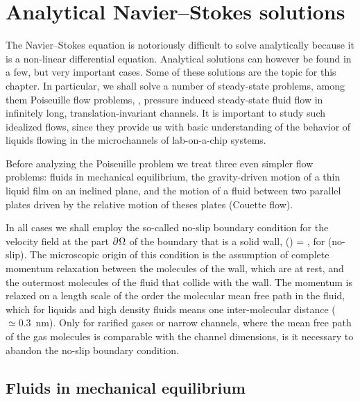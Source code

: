 

\chapter{Analytical Navier--Stokes solutions}

The Navier--Stokes equation is notoriously difficult to solve
analytically because it is a non-linear differential equation.
Analytical solutions can however be found in a few, but very
important cases. Some of these solutions are the topic for this
chapter. In particular, we shall solve a number of steady-state
problems, among them Poiseuille flow problems, \ie, pressure
induced steady-state fluid flow in infinitely long,
translation-invariant channels. It is important to study such
idealized flows, since they provide us with basic understanding of
the behavior of liquids flowing in the microchannels of
lab-on-a-chip systems.

Before analyzing the Poiseuille problem we treat three even
simpler flow problems: fluids in mechanical equilibrium, the
gravity-driven motion of a thin liquid film on an inclined plane,
and the motion of a fluid between two parallel plates driven by
the relative motion of theses plates (Couette flow).

In all cases we shall employ the so-called no-slip boundary
condition for the velocity field at the part $\partial^{{}} \Omega$ of the
boundary that is a solid wall,
%
 \vvv(\rrr) = ,
 \quad \textrm{for}\;\: \rrr \in \pp \Omega \; \;
  \textrm{(no-slip).}
 \eeq
%
The microscopic origin of this condition is the assumption of
complete momentum relaxation between the molecules of the wall,
which are at rest, and the outermost molecules of the fluid that
collide with the wall. The momentum is relaxed on a length scale
of the order the molecular mean free path in the fluid, which for
liquids and high density fluids means one inter-molecular distance
($\simeq0.3$~nm). Only for rarified gases or narrow channels,
where the mean free path of the gas molecules is comparable with
the channel dimensions, is it necessary to abandon the no-slip
boundary condition.


\section{Fluids in mechanical equilibrium} 

